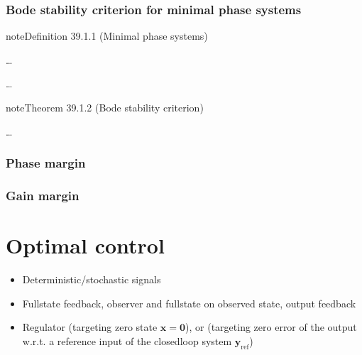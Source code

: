 \documentclass[letterpaper,10pt,english]{jupyterBook}
\begin{document}
\subsection{Bode stability criterion for minimal phase systems}
\label{\detokenize{ch/control/frequency-domain:bode-stability-criterion-for-minimal-phase-systems}}\label{\detokenize{ch/control/frequency-domain:control-siso-bode}}\label{ch/control/frequency-domain:def-minimal-phase}
\begin{sphinxadmonition}{note}{Definition 39.1.1 (Minimal phase systems)}



\sphinxAtStartPar
…
\end{sphinxadmonition}

\sphinxAtStartPar
…
\label{ch/control/frequency-domain:thm-bode}
\begin{sphinxadmonition}{note}{Theorem 39.1.2 (Bode stability criterion)}



\sphinxAtStartPar
…
\end{sphinxadmonition}


\subsection{Phase margin}
\label{\detokenize{ch/control/frequency-domain:phase-margin}}\label{\detokenize{ch/control/frequency-domain:control-siso-phase-margin}}

\subsection{Gain margin}
\label{\detokenize{ch/control/frequency-domain:gain-margin}}\label{\detokenize{ch/control/frequency-domain:control-siso-gain-margin}}
\sphinxstepscope


\chapter{Optimal control}
\label{\detokenize{ch/control/optimal-control:optimal-control}}\label{\detokenize{ch/control/optimal-control:control-optimal}}\label{\detokenize{ch/control/optimal-control::doc}}\begin{itemize}
\item {} 
\sphinxAtStartPar
Deterministic/stochastic signals

\item {} 
\sphinxAtStartPar
Full\sphinxhyphen{}state feedback, observer and full\sphinxhyphen{}state on observed state, output feedback

\item {} 
\sphinxAtStartPar
Regulator (targeting zero state \(\mathbf{x} = \mathbf{0}\)), or {\hyperref[\detokenize{ch/control/optimal-control-ref-tracking:control-optimal-ref-tracking}]{}} (targeting zero error of the output w.r.t. a reference input of the closed\sphinxhyphen{}loop system \(\mathbf{y}_{\text{ref}}\))

\end{itemize}
\end{document}
